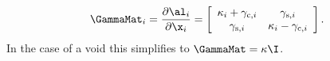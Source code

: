 \begin{equation}
\GammaMat_i = \frac{\partial\al_i}{\partial\x_i} = \left[\begin{array}{cc}
\kappa_i + \gamma_{\mathrm{c},i} & \gamma_{\mathrm{s},i} \\
\gamma_{\mathrm{s},i} & \kappa_i - \gamma_{\mathrm{c},i}
\end{array}\right].
\end{equation}
In the case of a void this simplifies to $\GammaMat = \kappa \I$.
 
  